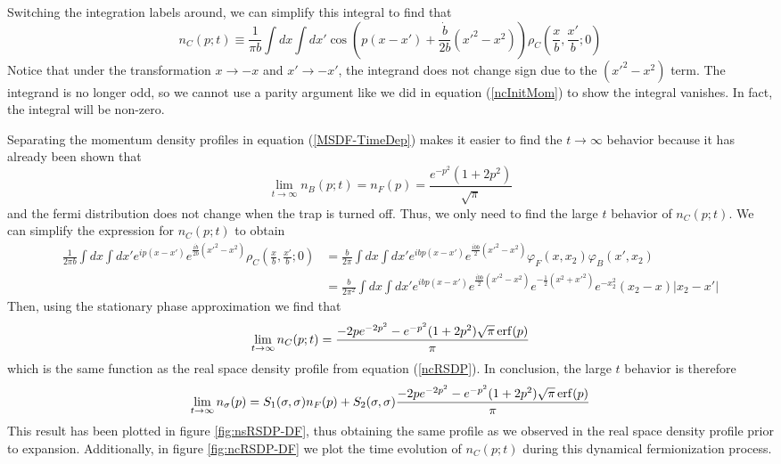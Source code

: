 \documentclass[onecolumn,english,aps,pra]{revtex4}
\begin{document}
Switching the integration labels around, we can simplify this integral to find that 
\begin{equation}
n_C(p;t) \equiv \frac{1}{\pi b} \int dx \int dx' \cos(p(x-x') + \frac{\dot{b}}{2b}(x'^2 - x^2))
\rho_C\left(\frac{x}{b},\frac{x'}{b};0\right)
\end{equation}
Notice that under the transformation $x\rightarrow -x$ and $x' \rightarrow -x'$, the integrand does not change sign due to the $(x'^2 -x^2)$ term. The integrand is no longer odd, so we cannot use a parity argument like we did in equation (\ref{ncInitMom}) to show the integral vanishes. In fact, the integral will be non-zero. 

Separating the momentum density profiles in equation (\ref{MSDF-TimeDep}) makes it  easier to find the $t \rightarrow \infty$ behavior because it has already been shown \cite{minguzzi2005exact} that
\begin{equation}
\lim_{t \rightarrow \infty} n_B(p;t) = n_F(p) = \frac{e^{-p^2}(1+2p^2)}{\sqrt{\pi}}
\end{equation}
and the fermi distribution does not change when the trap is turned off. Thus, we only need to find the large $t$ behavior of $n_C(p;t)$. We can simplify the expression for $n_C(p;t)$ to obtain
\begin{align*}
\frac{1}{2\pi b} \int dx \int dx' e^{ip(x-x')} e^{\frac{i\dot{b}}{2b}(x'^2 - x^2)}
\rho_C\left(\frac{x}{b},\frac{x'}{b};0\right) 
&= \frac{b}{2\pi} \int dx \int dx' e^{ibp(x-x')} e^{\frac{i\dot{b}b}{2}(x'^2 - x^2)}
\varphi_F(x,x_2)\varphi_B(x',x_2)\\
&= \frac{b}{2\pi^2} \int dx \int dx' e^{ibp(x-x')} e^{\frac{i\dot{b}b}{2}(x'^2 - x^2)}
e^{-\frac{1}{2}(x^2 + x'^2)}e^{-x_2^2} (x_2 -x)|x_2 - x'|
\end{align*}
Then, using the stationary phase approximation we find that
\begin{equation}
\lim_{t \rightarrow \infty} n_C(p;t) = \frac{-2pe^{-2p^2} - e^{-p^2}(1+2p^2)\sqrt{\pi}\erf(p)}{\pi}  
\label{ncMSDP-DF}
\end{equation}
which is the same function as the real space density profile from equation (\ref{ncRSDP}). In conclusion, the large $t$ behavior is therefore
\begin{equation}
\lim_{t \rightarrow \infty} n_\sigma(p) = S_1(\sigma, \sigma)n_F(p) + S_2(\sigma,\sigma) \frac{-2pe^{-2p^2} - e^{-p^2}(1+2p^2)\sqrt{\pi}\erf(p)}{\pi}
\end{equation} 
This result has been plotted in figure \ref{fig:nsRSDP-DF}, thus obtaining the same profile as we observed in the real space density profile prior to expansion. Additionally, in figure \ref{fig:ncRSDP-DF} we plot the time evolution of $n_C(p;t)$ during this dynamical fermionization process.
\end{document}

